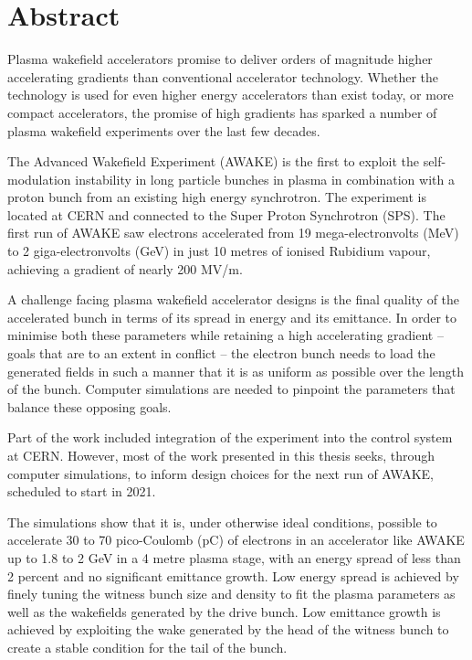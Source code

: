 \chapter*{Abstract}
\label{Abstract}

Plasma wakefield accelerators promise to deliver orders of magnitude higher accelerating gradients than conventional accelerator technology.
Whether the technology is used for even higher energy accelerators than exist today, or more compact accelerators, the promise of high gradients has sparked a number of plasma wakefield experiments over the last few decades.

The Advanced Wakefield Experiment (AWAKE) is the first to exploit the self-modulation instability in long particle bunches in plasma in combination with a proton bunch from an existing high energy synchrotron.
The experiment is located at CERN and connected to the Super Proton Synchrotron (SPS).
The first run of AWAKE saw electrons accelerated from 19 mega-electronvolts (MeV) to 2 giga-electronvolts (GeV) in just 10 metres of ionised Rubidium vapour, achieving a gradient of nearly 200 MV/m.

A challenge facing plasma wakefield accelerator designs is the final quality of the accelerated bunch in terms of its spread in energy and its emittance.
In order to minimise both these parameters while retaining a high accelerating gradient -- goals that are to an extent in conflict -- the electron bunch needs to load the generated fields in such a manner that it is as uniform as possible over the length of the bunch.
Computer simulations are needed to pinpoint the parameters that balance these opposing goals.

Part of the work included integration of the experiment into the control system at CERN.
However, most of the work presented in this thesis seeks, through computer simulations, to inform design choices for the next run of AWAKE, scheduled to start in 2021. 

The simulations show that it is, under otherwise ideal conditions, possible to accelerate 30 to 70 pico-Coulomb (pC) of electrons in an accelerator like AWAKE up to 1.8 to 2 GeV in a 4 metre plasma stage, with an energy spread of less than 2 percent and no significant emittance growth.
Low energy spread is achieved by finely tuning the witness bunch size and density to fit the plasma parameters as well as the wakefields generated by the drive bunch.
Low emittance growth is achieved by exploiting the wake generated by the head of the witness bunch to create a stable condition for the tail of the bunch.
